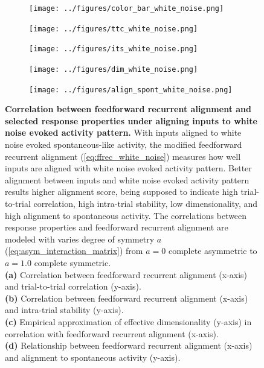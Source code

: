 \documentclass[11pt]{article}
\begin{document}
	\begin{figure}[H]
		\centering
		\begin{subfigure}[b]{0.8\textwidth}
			\centering
			\texttt{[image: ../figures/color\_bar\_white\_noise.png]}
		\end{subfigure}
		\newline
		\begin{subfigure}[b]{0.45\textwidth}
			\centering
			\texttt{[image: ../figures/ttc\_white\_noise.png]}
			\caption{}
		\end{subfigure}
		\hfill
		\begin{subfigure}[b]{0.45\textwidth}
			\centering
			\texttt{[image: ../figures/its\_white\_noise.png]}
			\caption{}
		\end{subfigure}
		\newline
		\begin{subfigure}[b]{0.45\textwidth}
			\centering
			\texttt{[image: ../figures/dim\_white\_noise.png]}
			\caption{}
		\end{subfigure}
		\hfill
		\begin{subfigure}[b]{0.45\textwidth}
			\centering
			\texttt{[image: ../figures/align\_spont\_white\_noise.png]}
			\caption{}
		\end{subfigure}
		\caption{\textbf{Correlation between feedforward recurrent alignment and selected response properties under aligning inputs to white noise evoked activity pattern.} With inputs aligned to white noise evoked spontaneous-like activity, the modified feedforward recurrent alignment (\ref{eq:ffrec_white_noise}) measures how well inputs are aligned with white noise evoked activity pattern. Better alignment between inputs and white noise evoked activity pattern results higher alignment score, being supposed to indicate high trial-to-trial correlation, high intra-trial stability, low dimensionality, and high alignment to spontaneous activity. The correlations between response properties and feedforward recurrent alignment are modeled with varies degree of symmetry $a$ (\ref{eq:asym_interaction_matrix}) from $a=0$ complete asymmetric to $a=1.0$ complete symmetric. \\
		\textbf{(a)} Correlation between feedforward recurrent alignment (x-axis) and trial-to-trial correlation (y-axis).\\
		\textbf{(b)} Correlation between feedforward recurrent alignment (x-axis) and intra-trial stability (y-axis).\\
		\textbf{(c)} Empirical approximation of effective dimensionality (y-axis) in correlation with feedforward recurrent alignment (x-axis).\\
		\textbf{(d)} Relationship between feedforward recurrent alignment (x-axis) and alignment to spontaneous activity (y-axis).} 
		\label{fig:ffrec_response_white_noise}
	\end{figure}
	
\end{document}
